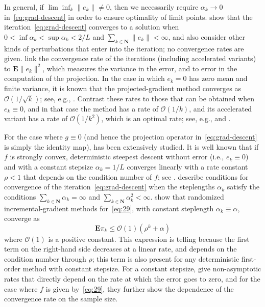 In general, if $\lim\inf_{k} \|e_{k}\| \neq 0$, then we necessarily
require $\alpha_k\to0$ in~\eqref{eq:grad-descent} in order to ensure optimality
of limit points. \cite[Theorem~3.4]{ComWaj2005}
show that the iteration~\eqref{eq:grad-descent} converges to a solution when
$0<\inf\alpha_k<\sup\alpha_k<2/L$ and
$\sum_{k\in\mathbf{N}}\|{e_k}\|<\infty$, and also consider other kinds
of perturbations that enter into the iteration; no convergence rates
are given.  \cite{SchmidtRouxBach:2011} link
the convergence rate of the iterations (including accelerated
variants) to $\mathbf{E} \|e_{k}\|^{2}$, which measures the variance in the
error, and to error in the computation of the projection. In the case in
which $e_k=0$ has zero mean and finite variance, it is known that the
projected-gradient method converges as $\mathcal{O}(1/\sqrt k)$; see, e.g.,
\cite{Langford:2009:SOL:1577069.1577097}. Contrast these rates
to those that can be obtained when $e_k\equiv0$, and in that case the
method has a rate of $\mathcal{O}(1/k)$, and its accelerated variant has a
rate of $\mathcal{O}(1/k^2)$, which is an optimal rate; see, e.g.,
\cite{Nes07} and \cite{BeT08}.

For the case where $g\equiv0$ (and hence the projection operator
in~\eqref{eq:grad-descent} is simply the identity map), has been extensively
studied. It is well known that if $f$ is strongly convex,
deterministic steepest descent without error (i.e., $e_k\equiv0$) and
with a constant stepsize $\alpha_k = 1/L$ converges linearly with a
rate constant $\rho<1$ that depends on the condition number of $f$;
see \cite[section~8.6]{luenberger2008linear}. \cite{BT:2000} describe conditions for convergence of the
iteration~\eqref{eq:grad-descent} when the steplengths $\alpha_k$ satisfy the
conditions $\sum_{k\in\mathbf{N}} \alpha_k = \infty$ and
$\sum_{k\in\mathbf{N}} \alpha_k^2 < \infty$. \cite{NedBer:2000} show that randomized incremental-gradient
methods for~\eqref{eq:29}, with constant steplength
$\alpha_k\equiv\alpha$, converge as 
\[ \mathbf{E}\pi_k \le \mathcal{O}(1)(\rho^k +
\alpha) \] 
where $\mathcal{O}(1)$ is a positive constant. This expression is
telling  because the first term on the right-hand side decreases at a
linear rate, and depends on the condition number through $\rho$; this
term is also present for any deterministic first-order method with
constant stepsize. For a constant stepsize, \cite{friedlander2012hybrid} give non-asymptotic rates that directly
depend on the rate at which the error goes to zero, and for the case
where $f$ is given by~\eqref{eq:29}, they further show the dependence
of the convergence rate on the sample size.


